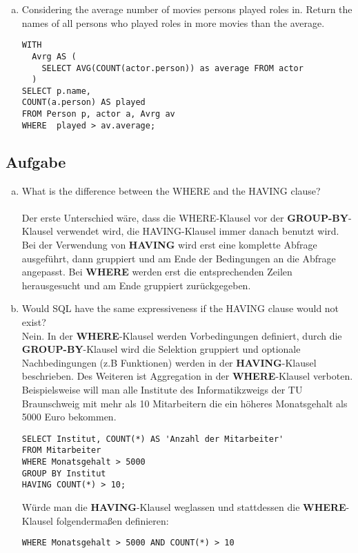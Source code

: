 \documentclass[11pt,a4paper,DIV=9]{scrartcl}
\newcounter{temp}
\newcommand{\aufgabe}[1]{
  \setcounter{temp}{\value{subsection}}
  \setcounter{subsection}{#1}
  \addtocounter{subsection}{-1}
  \subsection{Aufgabe}
  \setcounter{subsection}{\value{temp}}
}
\begin{document}
\begin{enumerate}[a.]
      \item Considering the average number of movies persons played roles in. Return the names of all persons who played roles in more movies than the average.\hfill
\begin{lstlisting}
WITH 
  Avrg AS (
    SELECT AVG(COUNT(actor.person)) as average FROM actor
  ) 
SELECT p.name, 
COUNT(a.person) AS played 
FROM Person p, actor a, Avrg av 
WHERE  played > av.average; 
\end{lstlisting}

      
    \end{enumerate}
\aufgabe{2}
\begin{enumerate}[a.]
\item What is the difference between the WHERE and the HAVING clause? \hfill\\\\
 Der erste Unterschied w\"are, dass die WHERE-Klausel vor der \textbf{GROUP-BY}-Klausel verwendet wird, die HAVING-Klausel immer danach benutzt wird. Bei der Verwendung von \textbf{HAVING} wird erst eine komplette Abfrage ausgef\"uhrt, dann gruppiert und am Ende der Bedingungen an die Abfrage angepasst. Bei \textbf{WHERE} werden erst die entsprechenden Zeilen herausgesucht und am Ende gruppiert zur\"uckgegeben. \\
\item Would SQL have the same expressiveness if the HAVING clause would not exist? \hfill\\
Nein. In der \textbf{WHERE}-Klausel werden Vorbedingungen definiert, durch die \textbf{GROUP-BY}-Klausel wird die Selektion gruppiert und optionale Nachbedingungen (z.B Funktionen) werden in der \textbf{HAVING}-Klausel beschrieben. Des Weiteren ist Aggregation in der \textbf{WHERE}-Klausel verboten. Beispielsweise will man alle Institute des Informatikzweigs der TU Braunschweig mit mehr als 10 Mitarbeitern die ein höheres Monatsgehalt als 5000 Euro bekommen. \\
\begin{lstlisting}
SELECT Institut, COUNT(*) AS 'Anzahl der Mitarbeiter'
FROM Mitarbeiter 
WHERE Monatsgehalt > 5000
GROUP BY Institut
HAVING COUNT(*) > 10;
\end{lstlisting}
W\"urde man die \textbf{HAVING}-Klausel weglassen und stattdessen die \textbf{WHERE}-Klausel folgenderma{\ss}en definieren: \\
\begin{lstlisting}[numbers=none]
WHERE Monatsgehalt > 5000 AND COUNT(*) > 10
\end{lstlisting}

\end{enumerate}
\end{document}
